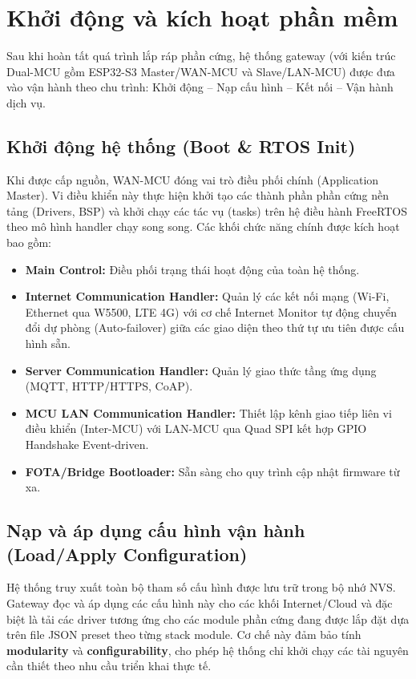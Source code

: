 \section{Khởi động và kích hoạt phần mềm}
    Sau khi hoàn tất quá trình lắp ráp phần cứng, hệ thống gateway (với kiến trúc Dual-MCU gồm ESP32-S3 Master/WAN-MCU và Slave/LAN-MCU) được đưa vào vận hành theo chu trình: Khởi động – Nạp cấu hình – Kết nối – Vận hành dịch vụ.

    \subsection{Khởi động hệ thống (Boot \& RTOS Init)}

    Khi được cấp nguồn, WAN-MCU đóng vai trò điều phối chính (Application Master). Vi điều khiển này thực hiện khởi tạo các thành phần phần cứng nền tảng (Drivers, BSP) và khởi chạy các tác vụ (tasks) trên hệ điều hành FreeRTOS theo mô hình handler chạy song song. Các khối chức năng chính được kích hoạt bao gồm:

    \begin{itemize}
        \item \textbf{Main Control:} Điều phối trạng thái hoạt động của toàn hệ thống.
        \item \textbf{Internet Communication Handler:} Quản lý các kết nối mạng (Wi-Fi, Ethernet qua W5500, LTE 4G) với cơ chế Internet Monitor tự động chuyển đổi dự phòng (Auto-failover) giữa các giao diện theo thứ tự ưu tiên được cấu hình sẵn.
        \item \textbf{Server Communication Handler:} Quản lý giao thức tầng ứng dụng (MQTT, HTTP/HTTPS, CoAP).
        \item \textbf{MCU LAN Communication Handler:} Thiết lập kênh giao tiếp liên vi điều khiển (Inter-MCU) với LAN-MCU qua Quad SPI kết hợp GPIO Handshake Event-driven.
        \item \textbf{FOTA/Bridge Bootloader:} Sẵn sàng cho quy trình cập nhật firmware từ xa.
    \end{itemize}

    \subsection{Nạp và áp dụng cấu hình vận hành (Load/Apply Configuration)}

    Hệ thống truy xuất toàn bộ tham số cấu hình được lưu trữ trong bộ nhớ NVS. Gateway đọc và áp dụng các cấu hình này cho các khối Internet/Cloud và đặc biệt là tải các driver tương ứng cho các module phần cứng đang được lắp đặt dựa trên file JSON preset theo từng stack module. Cơ chế này đảm bảo tính \textbf{modularity} và \textbf{configurability}, cho phép hệ thống chỉ khởi chạy các tài nguyên cần thiết theo nhu cầu triển khai thực tế.

